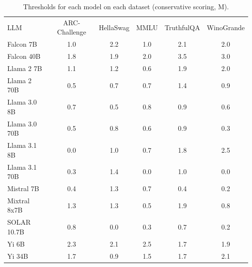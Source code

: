 \begin{table}[h]
\caption{Thresholds for each model on each dataset (conservative scoring, M). }
\label{tab:thresholds_logit_margin_k20_w2}
\centering
\begin{tabular}{l S[table-format=3.1] S[table-format=3.1] S[table-format=3.1] S[table-format=3.1] S[table-format=3.1]}
\toprule
LLM & ARC-Challenge & HellaSwag & MMLU & TruthfulQA & WinoGrande \\ 
\cmidrule(lr){1-1} \cmidrule(lr){2-2} \cmidrule(lr){3-3} \cmidrule(lr){4-4} \cmidrule(lr){5-5} \cmidrule(lr){6-6}
Falcon 7B & 1.0 & 2.2 & 1.0 & 2.1 & 2.0\\
Falcon 40B & 1.8 & 1.9 & 2.0 & 3.5 & 3.0\\
Llama 2 7B & 1.1 & 1.2 & 0.6 & 1.9 & 2.0\\
Llama 2 70B & 0.5 & 0.7 & 0.7 & 1.4 & 0.9\\
Llama 3.0 8B & 0.7 & 0.5 & 0.8 & 0.9 & 0.6\\
Llama 3.0 70B & 0.5 & 0.8 & 0.6 & 0.9 & 0.3\\
Llama 3.1 8B & 0.0 & 1.0 & 0.7 & 1.8 & 2.5\\
Llama 3.1 70B & 0.3 & 1.4 & 0.0 & 1.0 & 0.0\\
Mistral 7B & 0.4 & 1.3 & 0.7 & 0.4 & 0.2\\
Mixtral 8x7B & 1.3 & 1.3 & 0.5 & 1.9 & 0.8\\
SOLAR 10.7B & 0.8 & 0.0 & 0.3 & 0.7 & 0.2\\
Yi 6B & 2.3 & 2.1 & 2.5 & 1.7 & 1.9\\
Yi 34B & 1.7 & 0.9 & 1.5 & 1.7 & 2.1\\
\bottomrule
\end{tabular}
\end{table}
